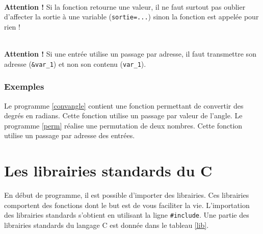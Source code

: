 \documentclass[a4paper,11pt]{book}
\newenvironment{warning} 
   {~\\ \textbf{Attention !}}{\\}
\theoremstyle{definition}
\begin{document}
\begin{warning}
Si la fonction retourne une valeur, il ne faut surtout pas oublier d'affecter la
sortie à une variable (\texttt{sortie=...}) sinon la fonction est appelée pour rien !
\end{warning}

\begin{warning}
Si une entrée utilise un passage par adresse, il faut transmettre son adresse (\texttt{\&var\_1}) et non son contenu (\texttt{var\_1}).
\end{warning}
\subsection{Exemples}
Le programme \ref{convangle} contient une fonction permettant de
convertir des degrés en radians. Cette fonction utilise un passage par valeur de l'angle. Le programme \ref{perm} réalise une permutation de deux nombres. Cette fonction utilise un passage par adresse des entrées.






\appendix


\newpage

\chapter{Les librairies standards du C}

En début de programme, il est possible d'importer des librairies. Ces librairies comportent des fonctions dont le but est de vous faciliter la vie. L'importation des librairies standards s'obtient en utilisant la ligne \texttt{\#include}. Une partie des librairies standards du langage C est donnée dans le tableau \ref{lib}.\\
\end{document}
